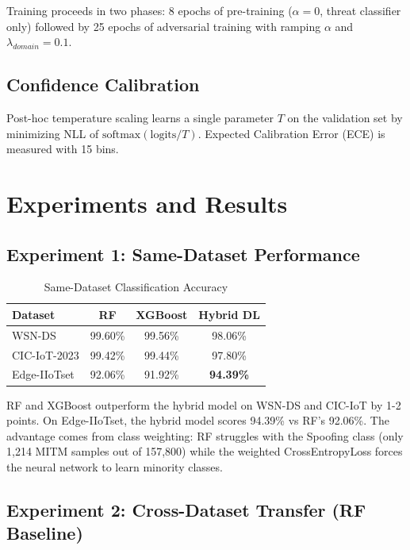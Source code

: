\documentclass[conference]{IEEEtran}
\begin{document}
Training proceeds in two phases: 8 epochs of pre-training ($\alpha=0$, threat classifier only) followed by 25 epochs of adversarial training with ramping $\alpha$ and $\lambda_{domain}=0.1$.

\subsection{Confidence Calibration}

Post-hoc temperature scaling learns a single parameter $T$ on the validation set by minimizing NLL of $\text{softmax}(\text{logits}/T)$. Expected Calibration Error (ECE) is measured with 15 bins.

\section{Experiments and Results}

\subsection{Experiment 1: Same-Dataset Performance}

\begin{table}[h]
\centering
\caption{Same-Dataset Classification Accuracy}
\label{tab:same-dataset}
\begin{tabular}{lccc}
\toprule
\textbf{Dataset} & \textbf{RF} & \textbf{XGBoost} & \textbf{Hybrid DL} \\
\midrule
WSN-DS & 99.60\% & 99.56\% & 98.06\% \\
CIC-IoT-2023 & 99.42\% & 99.44\% & 97.80\% \\
Edge-IIoTset & 92.06\% & 91.92\% & \textbf{94.39\%} \\
\bottomrule
\end{tabular}
\end{table}

RF and XGBoost outperform the hybrid model on WSN-DS and CIC-IoT by 1-2 points. On Edge-IIoTset, the hybrid model scores 94.39\% vs RF's 92.06\%. The advantage comes from class weighting: RF struggles with the Spoofing class (only 1,214 MITM samples out of 157,800) while the weighted CrossEntropyLoss forces the neural network to learn minority classes.

\subsection{Experiment 2: Cross-Dataset Transfer (RF Baseline)}
\end{document}
